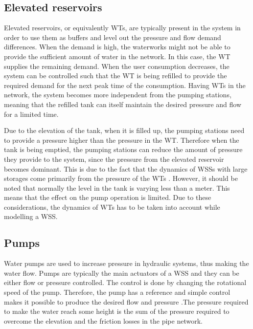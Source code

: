 \subsection{Elevated reservoirs}
\label{elevated_reservoirs}

Elevated reservoirs, or equivalently WTs, are typically present in the system in order to use them as buffers and level out the pressure and flow demand differences. When the demand is high, the waterworks might not be able to provide the sufficient amount of water in the network. In this case, the WT supplies the remaining demand. When the user consumption decreases, the system can be controlled such that the WT is being refilled to provide the required demand for the next peak time of the consumption. Having WTs in the network, the system becomes more independent from the pumping stations, meaning that the refilled tank can itself maintain the desired pressure and flow for a limited time. 

Due to the elevation of the tank, when it is filled up, the pumping stations need to provide a pressure higher than the pressure in the WT. Therefore when the tank is being emptied, the pumping stations can reduce the amount of pressure they provide to the system, since the pressure from the elevated reservoir becomes dominant. This is due to the fact that the dynamics of WSSs with large storages come primarily from the pressure of the WTs \cite{8thsemester_project}. However, it should be noted that normally the level in the tank is varying less than a meter. This means that the effect on the pump operation is limited. Due to these considerations, the dynamics of WTs has to be taken into account while modelling a WSS. 

\subsection{Pumps}
\label{pumps}

Water pumps are used to increase pressure in hydraulic systems, thus making the water flow. Pumps are typically the main actuators of a WSS and they can be either flow or pressure controlled. The control is done by changing the rotational speed of the pump. Therefore, the pump has a reference and simple control makes it possible to produce the desired flow and pressure \cite{kallesoePHD}.The pressure required to make the water reach some height is the sum of the pressure required to overcome the elevation and the friction losses in the pipe network. 

